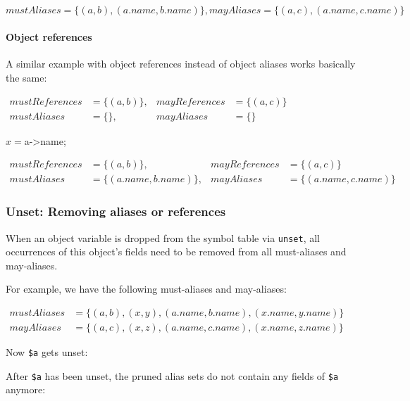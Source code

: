 $mustAliases = \{(a, b), (a.name, b.name)\}, mayAliases = \{(a, c), (a.name, c.name)\}$


\paragraph{Object references}

A similar example with object references instead of object aliases works basically the same:

$\begin{array}{llll}
mustReferences & = \{(a, b)\}, & mayReferences & = \{(a, c)\} \\
mustAliases & = \{\}, & mayAliases & = \{\}
\end{array}$

\begin{phpcode}
$x = $a->name;
\end{phpcode}

$\begin{array}{llll}
mustReferences & = \{(a, b)\}, & mayReferences & = \{(a, c)\} \\
mustAliases & = \{(a.name, b.name)\}, & mayAliases & = \{(a.name, c.name)\}
\end{array}$


\subsubsection{Unset: Removing aliases or references}

When an object variable is dropped from the symbol table via \texttt{unset}, all occurrences of this object's fields need to be removed from all must-aliases and may-aliases.

For example, we have the following must-aliases and may-aliases:

$\begin{array}{ll}
mustAliases & = \{(a, b), (x, y), (a.name, b.name), (x.name, y.name)\} \\
mayAliases & = \{(a, c), (x, z), (a.name, c.name), (x.name, z.name)\}
\end{array}$

Now \texttt{\$a} gets unset:


After \texttt{\$a} has been unset, the pruned alias sets do not contain any fields of \texttt{\$a} anymore:


